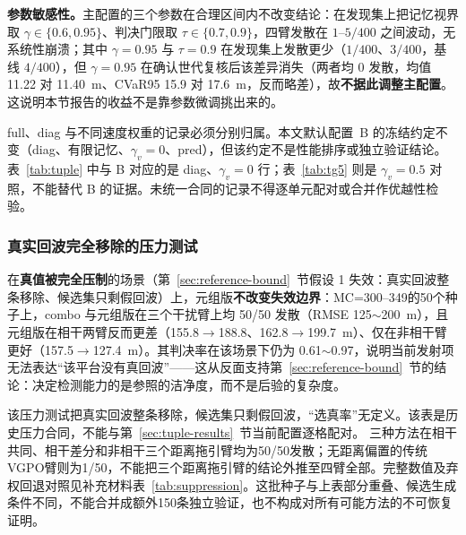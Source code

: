 \documentclass[UTF8,a4paper,zihao=-4]{ctexart}
\begin{document}
\textbf{参数敏感性。}主配置的三个参数在合理区间内不改变结论：在发现集上把记忆视界取 $\gamma\in\{0.6,0.95\}$、判决门限取 $\tau\in\{0.7,0.9\}$，四臂发散在 $1$--$5/400$ 之间波动，无系统性崩溃；其中 $\gamma=0.95$ 与 $\tau=0.9$ 在发现集上发散更少（$1/400$、$3/400$，基线 $4/400$），但 $\gamma=0.95$ 在确认世代复核后该差异消失（两者均 0 发散，均值 11.22 对 11.40~m、CVaR95 15.9 对 17.6~m，反而略差），故\textbf{不据此调整主配置}。这说明本节报告的收益不是靠参数微调挑出来的。

full、diag 与不同速度权重的记录必须分别归属。本文默认配置~B 的冻结约定不变（diag、有限记忆、$\gamma_v=0$、pred），但该约定不是性能排序或独立验证结论。表~\ref{tab:tuple} 中与 B 对应的是 diag、$\gamma_v=0$ 行；表~\ref{tab:tg5} 则是 $\gamma_v=0.5$ 对照，不能替代 B 的证据。未统一合同的记录不得逐单元配对或合并作优越性检验。

\subsubsection{真实回波完全移除的压力测试}\label{sec:suppression-results}

在\textbf{真值被完全压制}的场景（第~\ref{sec:reference-bound}~节假设 1 失效：真实回波整条移除、候选集只剩假回波）上，元组版\textbf{不改变失效边界}：MC=300--349的50个种子上，combo 与元组版在三个干扰臂上均 50/50 发散（RMSE 125\(\sim\)200~m），且元组版在相干两臂反而更差（155.8\(\to\)188.8、162.8\(\to\)199.7~m）、仅在非相干臂更好（157.5\(\to\)127.4~m）。其判决率在该场景下仍为 0.61\(\sim\)0.97，说明当前发射项无法表达“该平台没有真回波”——这从反面支持第~\ref{sec:reference-bound}~节的结论：决定检测能力的是参照的洁净度，而不是后验的复杂度。

该压力测试把真实回波整条移除，候选集只剩假回波，“选真率”无定义。该表是历史压力合同，不能与第~\ref{sec:tuple-results}~节当前配置逐格配对。
三种方法在相干共同、相干差分和非相干三个距离拖引臂均为50/50发散；无距离偏置的传统VGPO臂则为1/50，不能把三个距离拖引臂的结论外推至四臂全部。完整数值及弃权回退对照见补充材料表~\ref{tab:suppression}。这批种子与上表部分重叠、候选生成条件不同，不能合并成额外150条独立验证，也不构成对所有可能方法的不可恢复证明。
\end{document}
